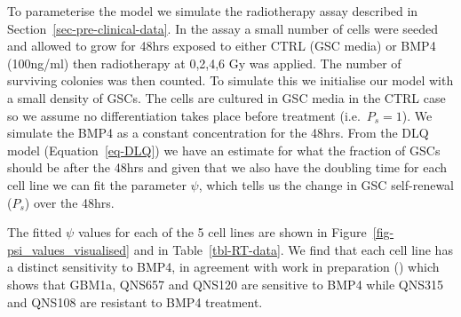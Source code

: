 \documentclass[
  letterpaper,
]{scrreprt}
\theoremstyle{definition}
\theoremstyle{remark}
\begin{document}
To parameterise the model we simulate the radiotherapy assay described
in Section~\ref{sec-pre-clinical-data}. In the assay a small number of
cells were seeded and allowed to grow for 48hrs exposed to either CTRL
(GSC media) or BMP4 (100ng/ml) then radiotherapy at 0,2,4,6 Gy was
applied. The number of surviving colonies was then counted. To simulate
this we initialise our model with a small density of GSCs. The cells are
cultured in GSC media in the CTRL case so we assume no differentiation
takes place before treatment (i.e.~\(P_s = 1\)). We simulate the BMP4 as
a constant concentration for the 48hrs. From the DLQ model
(Equation~\ref{eq-DLQ}) we have an estimate for what the fraction of
GSCs should be after the 48hrs and given that we also have the doubling
time for each cell line we can fit the parameter \(\psi\), which tells
us the change in GSC self-renewal (\(P_s\)) over the 48hrs.

The fitted \(\psi\) values for each of the 5 cell lines are shown in
Figure~\ref{fig-psi_values_visualised} and in Table~\ref{tbl-RT-data}.
We find that each cell line has a distinct sensitivity to BMP4, in
agreement with work in preparation () which shows that GBM1a, QNS657 and QNS120 are sensitive to BMP4
while QNS315 and QNS108 are resistant to BMP4 treatment.
\end{document}
